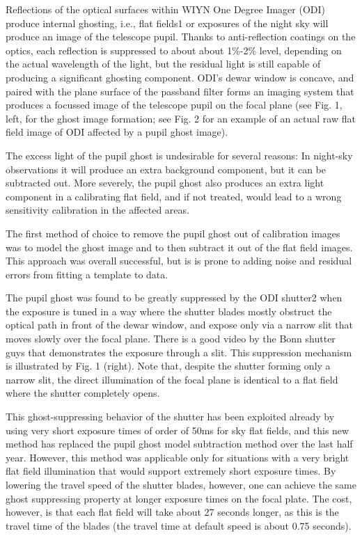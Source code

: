 \documentclass[]{spieman}
\begin{document}
Reflections of the optical surfaces within WIYN One Degree Imager (ODI)
produce internal ghosting, i.e., flat fields1 or exposures of the night sky
will produce an image of the telescope pupil. Thanks to anti-reflection
coatings on the optics, each reflection is suppressed to about about 1\%-2\%
level, depending on the actual wavelength of the light, but the residual
light is still capable of producing a significant ghosting component. ODI’s
dewar window is concave, and paired with the plane surface of the passband
filter forms an imaging system that produces a focussed image of the
telescope pupil on the focal plane (see Fig. 1, left, for the ghost image
formation; see Fig. 2 for an example of an actual raw flat field image of
ODI affected by a pupil ghost image).

The excess light of the pupil ghost is undesirable for several reasons: In
night-sky observations it will produce an extra background component, but it
can be subtracted out. More severely, the pupil ghost also produces an extra
light component in a calibrating flat field, and if not treated, would lead
to a wrong sensitivity calibration in the affected areas.

The first method of choice to remove the pupil ghost out of calibration
images was to model the ghost image and to then subtract it out of the flat
field images. This approach was overall successful, but is is prone to
adding noise and residual errors from fitting a template to data.

The pupil ghost was found to be greatly suppressed by the ODI shutter2 when
the exposure is tuned in a way where the shutter blades mostly obstruct the
optical path in front of the dewar window, and expose only via a narrow slit
that moves slowly over the focal plane. There is a good video by the Bonn
shutter guys that demonstrates the exposure through a slit. This suppression
mechanism is illustrated by Fig. 1 (right). Note that, despite the shutter
forming only a narrow slit, the direct illumination of the focal plane is
identical to a flat field where the shutter completely opens.

This ghost-suppressing behavior of the shutter has been exploited already by
using very short exposure times of order of 50ms for sky flat fields, and
this new method has replaced the pupil ghost model subtraction method over
the last half year. However, this method was applicable only for situations
with a very bright flat field illumination that would support extremely
short exposure times. By lowering the travel speed of the shutter blades,
however, one can achieve the same ghost suppressing property at longer
exposure times on the focal plate. The cost, however, is that each flat
field will take about 27 seconds longer, as this is the travel time of the
blades (the travel time at default speed is about 0.75 seconds).
\end{document}
